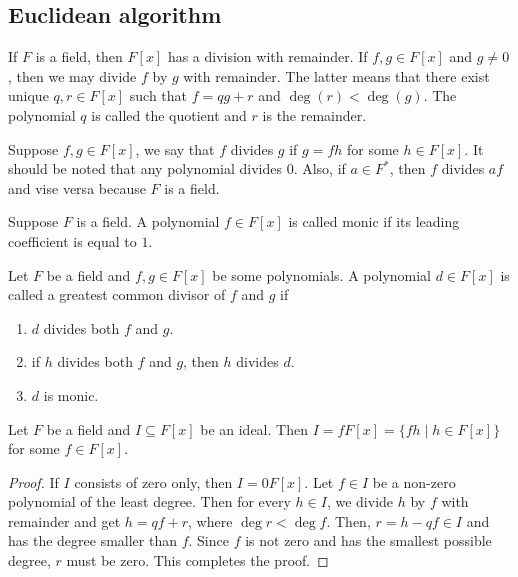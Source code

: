 \subsection{Euclidean algorithm}

If $F$ is a field, then $F[x]$ has a division with remainder.
If $f, g \in F[x]$ and $g\neq 0$, then we may divide $f$ by $g$ with remainder.
The latter means that there exist unique $q, r\in F[x]$ such that $f = q g + r$ and $\deg(r) < \deg (g)$.
The polynomial $q$ is called the quotient and $r$ is the remainder.

Suppose $f, g\in F[x]$, we say that $f$ divides $g$ if $g = fh$ for some $h\in F[x]$.
It should be noted that any polynomial divides $0$.
Also, if $a\in F^*$, then $f$ divides $af$ and vise versa because $F$ is a field.

\begin{definition}
Suppose $F$ is a field.
A polynomial $f\in F[x]$ is called monic if its leading coefficient is equal to $1$.
\end{definition}

\begin{definition}
Let $F$ be a field and $f, g\in F[x]$ be some polynomials.
A polynomial $d\in F[x]$ is called a greatest common divisor of $f$ and $g$ if
\begin{enumerate}
\item $d$ divides both $f$ and $g$.

\item if $h$ divides both $f$ and $g$, then $h$ divides $d$.

\item $d$ is monic.
\end{enumerate}
\end{definition}


\begin{claim}
\label{claim::PolyIdeals}
Let $F$ be a field and $I\subseteq F[x]$ be an ideal.
Then $I = f F[x] = \{fh\mid h\in F[x]\}$ for some $f\in F[x]$.
\end{claim}
\begin{proof}
If $I$ consists of zero only, then $I = 0 F[x]$.
Let $f\in I$ be a non-zero polynomial of the least degree.
Then for every $h\in I$, we divide $h$ by $f$ with remainder and get $h = qf + r$, where $\deg r < \deg f$.
Then, $r = h - qf \in I$ and has the degree smaller than $f$.
Since $f$ is not zero and has the smallest possible degree, $r$ must be zero.
This completes the proof.
\end{proof}

